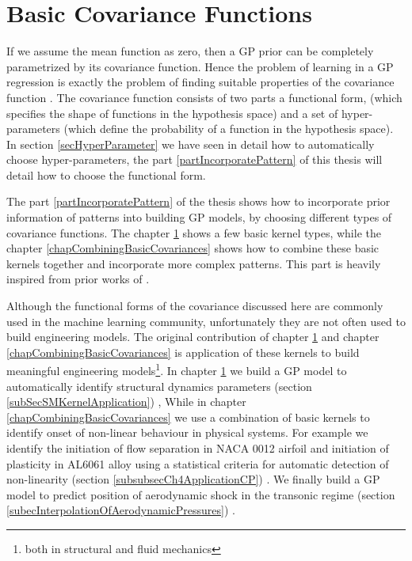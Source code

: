 \chapter{Basic Covariance Functions}
\label{chapBasicCovarianceKernels}

If we assume the mean function as zero, then a GP prior can be completely parametrized by its covariance function. Hence the problem of learning in a GP regression is exactly the problem of finding suitable properties of the covariance function \cite{rasmussen2006gaussian}. The covariance function consists of two parts a functional form, (which specifies the shape of functions in the hypothesis space) and a set of hyper-parameters (which define the probability of a function in the hypothesis space). In section \ref{secHyperParameter} we have seen in detail how to automatically choose hyper-parameters, the part \ref{partIncorporatePattern} of this thesis will detail how to choose the functional form. 

The part \ref{partIncorporatePattern} of the thesis shows how to incorporate prior information of patterns into building GP models, by choosing different types of covariance functions. The chapter \ref{chapBasicCovarianceKernels} shows a few basic kernel types, while the chapter \ref{chapCombiningBasicCovariances} shows how to combine these basic kernels together and incorporate more complex patterns. This part is heavily inspired from prior works of \cite{duvenaud-thesis-2014, wilson2014thesis, lloyd2014automatic, durrande2001etude}. 

Although the functional forms of the covariance discussed here are commonly used in the machine learning community, unfortunately they are not often used to build engineering models. The original contribution of chapter \ref{chapBasicCovarianceKernels} and chapter \ref{chapCombiningBasicCovariances} is application of these kernels to build meaningful engineering models\footnote{both in structural and fluid mechanics}. In chapter \ref{chapBasicCovarianceKernels} we build a GP model to automatically identify structural dynamics parameters (section \ref{subSecSMKernelApplication}) \cite{chiplunkar2017operational}, While in chapter \ref{chapCombiningBasicCovariances} we use a combination of basic kernels to identify onset of non-linear behaviour in physical systems. For example we identify the initiation of flow separation in NACA 0012 airfoil and initiation of plasticity in AL6061 alloy using a statistical criteria for automatic detection of non-linearity (section \ref{subsubsecCh4ApplicationCP}) \cite{chiplunkar:hal-01555401}. We finally build a GP model to predict position of aerodynamic shock in the transonic regime (section \ref{subecInterpolationOfAerodynamicPressures}) \cite{oatao18004}. 
  
